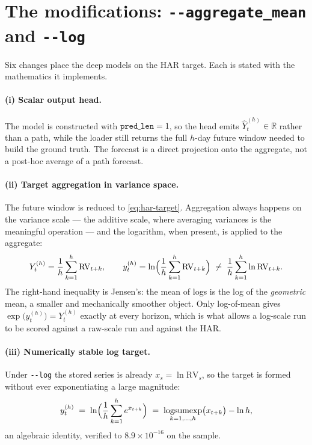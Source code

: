 \documentclass[11pt,a4paper]{article}
\newcommand{\RV}{\mathrm{RV}}
\begin{document}
\section{The modifications: \texttt{-{}-aggregate\_mean} and \texttt{-{}-log}}
\label{sec:modifications}

Six changes place the deep models on the HAR target. Each is stated with the mathematics it
implements.

\paragraph{(i) Scalar output head.} The model is constructed with
$\texttt{pred\_len}=1$, so the head emits $\hat{Y}^{(h)}_{t}\in\mathbb{R}$ rather than a
path, while the loader still returns the full $h$-day future window needed to build the
ground truth. The forecast is a direct projection onto the aggregate, not a post-hoc
average of a path forecast.

\paragraph{(ii) Target aggregation in variance space.} The future window is reduced to
\eqref{eq:har-target}. Aggregation always happens on the variance scale --- the additive
scale, where averaging variances is the meaningful operation --- and the logarithm, when
present, is applied to the aggregate:
\begin{equation}
  Y^{(h)}_{t}=\frac{1}{h}\sum_{k=1}^{h}\RV_{t+k},
  \qquad
  y^{(h)}_{t}=\ln\Bigl(\frac{1}{h}\sum_{k=1}^{h}\RV_{t+k}\Bigr)
  \;\ne\;
  \frac{1}{h}\sum_{k=1}^{h}\ln \RV_{t+k}.
  \label{eq:logofmean}
\end{equation}
The right-hand inequality is Jensen's: the mean of logs is the log of the \emph{geometric}
mean, a smaller and mechanically smoother object. Only log-of-mean gives
$\exp\bigl(y^{(h)}_{t}\bigr)=Y^{(h)}_{t}$ exactly at every horizon, which is what allows a
log-scale run to be scored against a raw-scale run and against the HAR.

\paragraph{(iii) Numerically stable log target.} Under \texttt{-{}-log} the stored series is
already $x_s=\ln \RV_s$, so the target is formed without ever exponentiating a large
magnitude:
\begin{equation}
  y^{(h)}_{t}
  \;=\;\ln\Bigl(\frac{1}{h}\sum_{k=1}^{h}e^{x_{t+k}}\Bigr)
  \;=\;\operatorname*{logsumexp}_{k=1,\dots,h}\bigl(x_{t+k}\bigr)-\ln h ,
  \label{eq:logsumexp}
\end{equation}
an algebraic identity, verified to $8.9\times10^{-16}$ on the sample.
\end{document}

